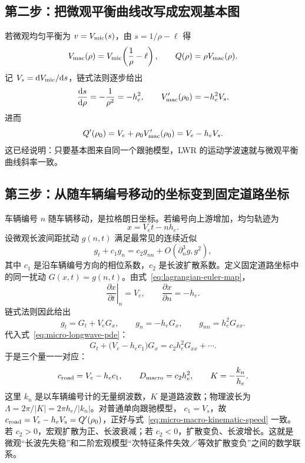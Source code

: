\documentclass[11pt,a4paper,openany]{book}
\numberwithin{equation}{chapter}
\numberwithin{figure}{chapter}
\numberwithin{table}{chapter}
\begin{document}
\subsection{第二步：把微观平衡曲线改写成宏观基本图}

若微观均匀平衡为 $v=V_{\rm mic}(s)$，由
$s=1/\rho-\ell$ 得
\begin{equation}
V_{\rm mac}(\rho)
=V_{\rm mic}\!\left(\frac{1}{\rho}-\ell\right),
\qquad Q(\rho)=\rho V_{\rm mac}(\rho).
\label{eq:micro-macro-equilibrium-map}
\end{equation}
记 $V_s=\mathrm dV_{\rm mic}/\mathrm ds$，链式法则逐步给出
\begin{equation}
\frac{\mathrm ds}{\mathrm d\rho}=-\frac1{\rho^2}=-h_e^2,
\qquad
V'_{\rm mac}(\rho_0)=-h_e^2V_s,
\end{equation}
进而
\begin{equation}
Q'(\rho_0)
=V_e+\rho_0V'_{\rm mac}(\rho_0)
=V_e-h_eV_s.
\label{eq:micro-macro-kinematic-speed}
\end{equation}
这已经说明：只要基本图来自同一个跟驰模型，LWR 的运动学波速就与微观平衡曲线斜率一致。

\subsection{第三步：从随车辆编号移动的坐标变到固定道路坐标}

车辆编号 $n$ 随车辆移动，是拉格朗日坐标。若编号向上游增加，均匀轨迹为
\begin{equation}
x=V_et-nh_e.
\label{eq:lagrangian-euler-map}
\end{equation}
设微观长波间距扰动 $g(n,t)$ 满足最常见的连续近似
\begin{equation}
g_t+c_1g_n=c_2g_{nn}+O(\partial_n^3g,g^2),
\label{eq:micro-longwave-pde}
\end{equation}
其中 $c_1$ 是沿车辆编号方向的相位系数，$c_2$ 是长波扩散系数。定义固定道路坐标中的同一扰动
$G(x,t)=g(n,t)$。由式~\eqref{eq:lagrangian-euler-map}，
\begin{equation}
\left.\frac{\partial x}{\partial t}\right|_n=V_e,
\qquad
\frac{\partial x}{\partial n}=-h_e.
\end{equation}
链式法则因此给出
\begin{equation}
g_t=G_t+V_eG_x,\qquad
g_n=-h_eG_x,\qquad
g_{nn}=h_e^2G_{xx}.
\label{eq:derivative-map-micro-macro}
\end{equation}
代入式~\eqref{eq:micro-longwave-pde}：
\begin{equation}
\boxed{
G_t+\bigl(V_e-h_ec_1\bigr)G_x
=c_2h_e^2G_{xx}+\cdots .}
\label{eq:eulerian-longwave-pde}
\end{equation}
于是三个量一一对应：
\begin{equation}
c_{\rm road}=V_e-h_ec_1,\qquad
D_{\rm macro}=c_2h_e^2,\qquad
K=-\frac{k_n}{h_e}.
\label{eq:micro-macro-coefficient-map}
\end{equation}
这里 $k_n$ 是以车辆编号计的无量纲波数，$K$ 是道路波数；物理波长为
$\Lambda=2\pi/|K|=2\pi h_e/|k_n|$。对普通单向跟驰模型，
$c_1=V_s$，故 $c_{\rm road}=V_e-h_eV_s=Q'(\rho_0)$，正好与式~\eqref{eq:micro-macro-kinematic-speed} 一致。若 $c_2>0$，宏观扩散为正、长波衰减；若 $c_2<0$，扩散变负、长波增长。这就是微观“长波先失稳”和二阶宏观模型“次特征条件失效／等效扩散变负”之间的数学联系。
\end{document}
